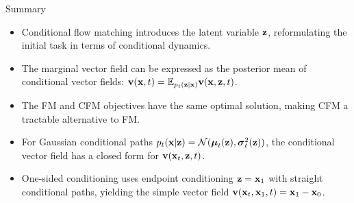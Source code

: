 \documentclass{beamer}
\begin{document}
\begin{frame}{Summary}
	\begin{itemize}
		\item Conditional flow matching introduces the latent variable $\mathbf{z}$, reformulating the initial task in terms of conditional dynamics.
		\vfill
		\item The marginal vector field can be expressed as the posterior mean of conditional vector fields: $\mathbf{v}(\mathbf{x}, t) = \mathbb{E}_{p_t(\mathbf{z} | \mathbf{x})} \mathbf{v}(\mathbf{x}, \mathbf{z}, t)$.
		\vfill
		\item The FM and CFM objectives have the same optimal solution, making CFM a tractable alternative to FM.
		\vfill
		\item For Gaussian conditional paths $p_t(\mathbf{x} | \mathbf{z}) = \mathcal{N}(\boldsymbol{\mu}_t(\mathbf{z}), \boldsymbol{\sigma}_t^2(\mathbf{z}))$, the conditional vector field has a closed form for $\mathbf{v}(\mathbf{x}_t, \mathbf{z}, t)$.
		\vfill
		\item One-sided conditioning uses endpoint conditioning $\mathbf{z} = \mathbf{x}_1$ with straight conditional paths, yielding the simple vector field $\mathbf{v}(\mathbf{x}_t, \mathbf{x}_1, t) = \mathbf{x}_1 - \mathbf{x}_0$.
	\end{itemize}
\end{frame}
\end{document}
